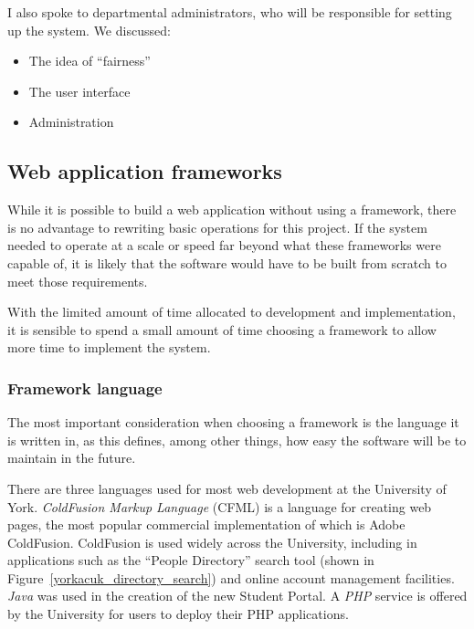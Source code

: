 \documentclass[]{scrartcl}
\begin{document}
I also spoke to departmental administrators, who will be responsible for setting up
the system. We discussed:

\begin{itemize}
  \item The idea of ``fairness''
  \item The user interface
  \item Administration
\end{itemize}


\subsection{Web application frameworks}
\label{sec:webframeworks}


While it is possible to build a web application without using a framework,
there is no advantage to rewriting basic operations for this project. If the
system needed to operate at a scale or speed far beyond what these frameworks
were capable of, it is likely that the software would have to be built from
scratch to meet those requirements.

With the limited amount of time allocated to development and implementation,
it is sensible to spend a small amount of time choosing a framework to allow
more time to implement the system.


\subsubsection{Framework language}


The most important consideration when choosing a framework is the language it
is written in, as this defines, among other things, how easy the software will
be to maintain in the future.


There are three languages used for most web development at the University of
York. \emph{ColdFusion Markup Language} (CFML) is a language for creating web pages,
the most popular commercial implementation of which is Adobe ColdFusion.
ColdFusion is used widely across the University, including in applications
such as the ``People Directory'' search tool (shown in
Figure~\ref{yorkacuk_directory_search}) and online account management
facilities. \emph{Java} was used in the creation of the new Student Portal. A
\emph{PHP} service is offered by the University for users to deploy their PHP
applications.
\end{document}
